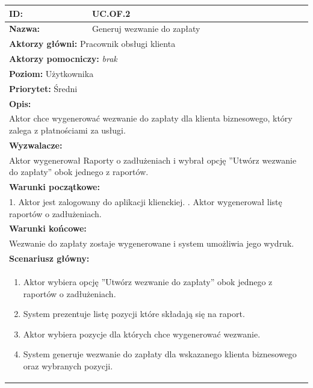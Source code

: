\begin{center}
\begin{longtable}[h]{|p{1.6cm}|p{13.5cm}|}
\hline
\textbf{ID:} & UC.OF.2 \\ \hline
\textbf{Nazwa:} & Generuj wezwanie do zapłaty \\ \hline
\multicolumn{2}{|p{15.1cm}|}{\textbf{Aktorzy główni:} Pracownik obsługi klienta} \\
\multicolumn{2}{|p{15.1cm}|}{\textbf{Aktorzy pomocniczy:} 
\textit{brak}} \\
\multicolumn{2}{|p{15.1cm}|}{\textbf{Poziom:} Użytkownika} \\
\multicolumn{2}{|p{15.1cm}|}{\textbf{Priorytet:} Średni} \\
\hline
\multicolumn{2}{|p{15.1cm}|}{\textbf{Opis:}} \\
\multicolumn{2}{|p{15.1cm}|}{
Aktor chce wygenerować wezwanie do zapłaty dla klienta biznesowego, który zalega z płatnościami za usługi.
} \\ \hline
\multicolumn{2}{|p{15.1cm}|}{\textbf{Wyzwalacze:}} \\
\multicolumn{2}{|p{15.1cm}|}{
Aktor wygenerował Raporty o zadłużeniach i wybrał opcję ''Utwórz wezwanie do zapłaty'' obok jednego z raportów.
} \\ \hline
\multicolumn{2}{|p{15.1cm}|}{\textbf{Warunki początkowe:}} \\
\multicolumn{2}{|p{15.1cm}|}{
1. Aktor jest zalogowany do aplikacji klienckiej. \newline
2. Aktor wygenerował listę raportów o zadłużeniach.
} \\ \hline
\multicolumn{2}{|p{15.1cm}|}{\textbf{Warunki końcowe:}} \\
\multicolumn{2}{|p{15.1cm}|}{
Wezwanie do zapłaty zostaje wygenerowane i system umożliwia jego wydruk.
} \\ \hline
\multicolumn{2}{|p{15.1cm}|}{\textbf{Scenariusz główny:}} \\
\multicolumn{2}{|p{15.1cm}|}{
\begin{enumerate}
\item Aktor wybiera opcję ''Utwórz wezwanie do zapłaty'' obok jednego z raportów o zadłużeniach.
\item System prezentuje listę pozycji które składają się na raport.
\item Aktor wybiera pozycje dla których chce wygenerować wezwanie.
\item System generuje wezwanie do zapłaty dla wskazanego klienta biznesowego oraz wybranych pozycji.

\end{enumerate}}
\end{longtable}
\end{center}
